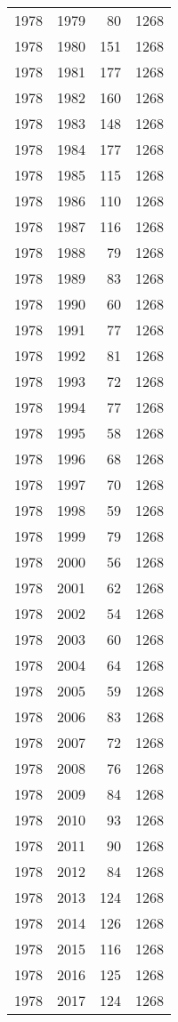 \documentclass[
  11pt,
  letterpaper,
  DIV=11,
  numbers=noendperiod,
  twoside]{scrartcl}
\begin{document}
\begin{longtable}[]{@{}rrrr@{}}
1978 & 1979 & 80 & 1268 \\
1978 & 1980 & 151 & 1268 \\
1978 & 1981 & 177 & 1268 \\
1978 & 1982 & 160 & 1268 \\
1978 & 1983 & 148 & 1268 \\
1978 & 1984 & 177 & 1268 \\
1978 & 1985 & 115 & 1268 \\
1978 & 1986 & 110 & 1268 \\
1978 & 1987 & 116 & 1268 \\
1978 & 1988 & 79 & 1268 \\
1978 & 1989 & 83 & 1268 \\
1978 & 1990 & 60 & 1268 \\
1978 & 1991 & 77 & 1268 \\
1978 & 1992 & 81 & 1268 \\
1978 & 1993 & 72 & 1268 \\
1978 & 1994 & 77 & 1268 \\
1978 & 1995 & 58 & 1268 \\
1978 & 1996 & 68 & 1268 \\
1978 & 1997 & 70 & 1268 \\
1978 & 1998 & 59 & 1268 \\
1978 & 1999 & 79 & 1268 \\
1978 & 2000 & 56 & 1268 \\
1978 & 2001 & 62 & 1268 \\
1978 & 2002 & 54 & 1268 \\
1978 & 2003 & 60 & 1268 \\
1978 & 2004 & 64 & 1268 \\
1978 & 2005 & 59 & 1268 \\
1978 & 2006 & 83 & 1268 \\
1978 & 2007 & 72 & 1268 \\
1978 & 2008 & 76 & 1268 \\
1978 & 2009 & 84 & 1268 \\
1978 & 2010 & 93 & 1268 \\
1978 & 2011 & 90 & 1268 \\
1978 & 2012 & 84 & 1268 \\
1978 & 2013 & 124 & 1268 \\
1978 & 2014 & 126 & 1268 \\
1978 & 2015 & 116 & 1268 \\
1978 & 2016 & 125 & 1268 \\
1978 & 2017 & 124 & 1268 \\

\end{longtable}
\end{document}

